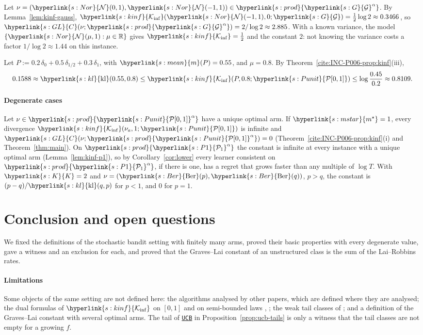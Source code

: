 \documentclass[11pt]{article}
\newcommand{\R}{\mathbb{R}}
\newcommand{\sy}[2]{{\hyperlink{#1}{#2}}}
\newcommand{\Pone}{\sy{s:P1}{\mathcal{P}_{1}}}
\newcommand{\mean}{\sy{s:mean}{m}}
\newcommand{\kl}{\sy{s:kl}{\mathrm{kl}}}
\newcommand{\Ber}{\sy{s:Ber}{\mathrm{Ber}}}
\newcommand{\Kinf}{\sy{s:kinf}{\mathcal{K}_{\inf}}}
\newcommand{\Punit}{\sy{s:Punit}{\mathcal{P}[0,1]}}
\newcommand{\Nor}{\sy{s:Nor}{\mathcal{N}}}
\newcommand{\Gau}{\sy{s:G}{\mathcal{G}}}
\newcommand{\Karms}{\sy{s:K}{K}}
\newcommand{\ms}{\sy{s:mstar}{m^{\star}}}
\newcommand{\powc}[1]{\sy{s:prod}{#1^{\alpha}}}
\newcommand{\GL}{\sy{s:GL}{C}}
\newcommand{\ucb}{\hyperref[alg:ucb]{\texttt{UCB}}}
\begin{document}
\begin{example}
Let $\nu=(\Nor(0,1),\Nor(-1,1))\in\powc{\Gau}$. By Lemma~\ref{lem:kinf-gauss},
$\Kinf(\Nor(-1,1),0;\Gau)=\frac12\log2\approx0.3466$, so $\GL(\nu;\powc{\Gau})=2/\log2\approx2.885$.
With a known variance, the model $\{\Nor(\mu,1):\mu\in\R\}$ gives
$\Kinf=\frac12$ and the constant $2$: not knowing the variance costs a factor $1/\log2\approx1.44$ on
this instance.
\end{example}

\begin{example}
Let $P:=0.2\,\delta_0+0.5\,\delta_{1/2}+0.3\,\delta_1$, with $\mean(P)=0.55$, and $\mu=0.8$. By
Theorem~\ref{cite:INC-P006-prop:kinf}(iii),
\begin{equation*}
  0.1588\approx\kl(0.55,0.8)\le\Kinf(P,0.8;\Punit)\le\log\frac{0.45}{0.2}\approx0.8109.
\end{equation*}
\end{example}

\paragraph{Degenerate cases} Let $\nu\in\powc{\Punit}$ have a unique optimal arm. If $\ms=1$, every
divergence $\Kinf(\nu_a,1;\Punit)$ is infinite and $\GL(\nu;\powc{\Punit})=0$
(Theorem~\ref{cite:INC-P006-prop:kinf}(i) and Theorem~\ref{thm:main}). On $\powc{\Pone}$ the
constant is infinite at every instance with a unique optimal arm (Lemma~\ref{lem:kinf-p1}), so by
Corollary~\ref{cor:lower} every learner consistent on $\powc{\Pone}$, if there is one, has a regret
that grows faster than any multiple of $\log T$. With $\Karms=2$ and $\nu=(\Ber(p),\Ber(q))$, $p>q$,
the constant is $(p-q)/\kl(q,p)$ for $p<1$, and $0$ for $p=1$.

\section{Conclusion and open questions}\label{sec:open}

We fixed the definitions of the stochastic bandit setting with finitely many arms, proved their
basic properties with every degenerate value, gave a witness and an exclusion for each, and proved
that the Graves--Lai constant of an unstructured class is the sum of the Lai--Robbins rates.

\paragraph{Limitations} Some objects of the same setting are not defined here: the algorithms
analysed by other papers, which are defined where they are analysed; the dual formulas of $\Kinf$
on $[0,1]$ and on semi-bounded laws \citep[Theorem~8]{HT10}, \citep[Theorem~2]{HT15}; the weak tail
classes of \citet[Definition~3]{SA11}; and a definition of the Graves--Lai constant with several
optimal arms. The tail of \ucb{} in Proposition~\ref{prop:ucb-tails} is only a witness that the tail
classes are not empty for a growing $f$.
\end{document}
